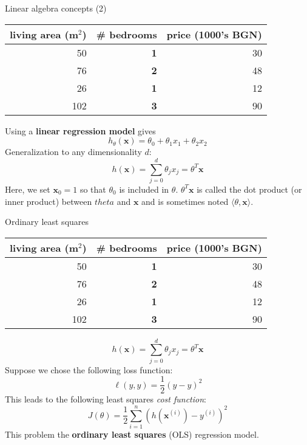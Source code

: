 \documentclass{beamer}
\newcommand{\yhat}{\hat{y}}
\newcommand{\bxi}{\bm{x}^{(i)}}
\newcommand{\bx}{\bm{x}}
\newcommand{\yi}{y^{(i)}}
\begin{document}
\begin{frame}{Linear algebra concepts (2)}
\begin{table}
\centering
\begin{tabular}{r|r|r}
living area (m$^2$) &  \textbf{\# bedrooms} & price (1000's BGN) \\\hline
50 & \textbf{1} & 30\\
76 & \textbf{2} & 48\\
26 & \textbf{1} & 12\\
102 & \textbf{3} & 90\\
\end{tabular}
\end{table}
\vfill
\pause
Using a \textbf{linear regression model} gives
\begin{equation*}
h_\theta(\bx) = \theta_0 + \theta_1 x_1 + \theta_2 x_2
\end{equation*}
Generalization to any dimensionality $d$:
\begin{equation*}
h(\bx) = \sum_{j = 0}^{d} \theta_j x_j = \theta^T \bx
\end{equation*}
Here, we set $\bx_0 = 1$ so that $\theta_0$ is included in $\theta$. $\theta^T \bx$ is called the dot product (or inner product) between $theta$ and $\bx$ and is sometimes noted $\langle {\theta, \bx} \rangle$.
\end{frame}

\begin{frame}{Ordinary least squares}
\begin{table}
\centering
\begin{tabular}{r|r|r}
living area (m$^2$) &  \textbf{\# bedrooms} & price (1000's BGN) \\\hline
50 & \textbf{1} & 30\\
76 & \textbf{2} & 48\\
26 & \textbf{1} & 12\\
102 & \textbf{3} & 90\\
\end{tabular}
\end{table}
\vfill
\begin{equation*}
h(\bx) = \sum_{j = 0}^{d} \theta_j x_j = \theta^T \bx
\end{equation*}
\pause
\vfill
Suppose we chose the following loss function:
\begin{equation*}
\ell \left( y, \yhat \right) = \dfrac{1}{2} \left( y - \yhat \right)^2
\end{equation*}
This leads to the following least squares \textit{cost function}:
\begin{equation*}
J(\theta) = \dfrac{1}{2} \sum_{i = 1}^{n} \left( h\left(\bxi\right) - \yi \right)^2
\end{equation*}
This problem the \textbf{ordinary least squares} (OLS) regression model.
\end{frame}
\end{document}

